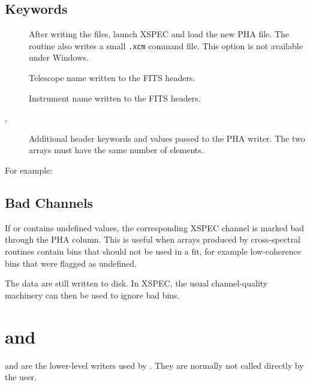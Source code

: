 \subsection{Keywords}

\begin{description}
\item[] After writing the files, launch XSPEC and load the new
  PHA file.  The routine also writes a small \texttt{.xcm} command file.  This
  option is not available under Windows.
\item[] Telescope name written to the FITS headers.
\item[] Instrument name written to the FITS headers.
\item[, ] Additional header
  keywords and values passed to the PHA writer.  The two arrays must have the
  same number of elements.
\end{description}

For example:


\subsection{Bad Channels}

If  or  contains undefined values, the
corresponding XSPEC channel is marked bad through the PHA 
column.  This is useful when arrays produced by cross-spectral routines contain
bins that should not be used in a fit, for example low-coherence bins that were
flagged as undefined.

The data are still written to disk.  In XSPEC, the usual channel-quality
machinery can then be used to ignore bad bins.

\section{ and }

 and  are the lower-level writers used by
.  They are normally not called directly by the user.

\subsection{}

